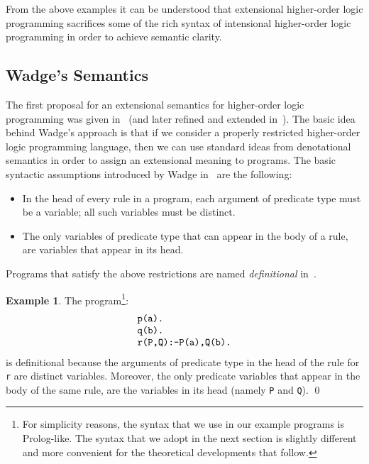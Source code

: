 \documentclass[submission,copyright]{eptcs}
\theoremstyle{definition}
\newtheorem{example}{Example}
\begin{document}
From the above examples it can be understood that extensional higher-order
logic programming sacrifices some of the rich syntax of intensional higher-order
logic programming in order to achieve semantic clarity.

\subsection{Wadge's Semantics}
The first proposal for an extensional semantics for higher-order logic programming
was given in~\cite{Wa91a} (and later refined and extended in~\cite{KRW05,CharalambidisHRW13,CharalambidisER14}).
The basic idea behind Wadge's approach is that if we consider a properly restricted
higher-order logic programming language, then we can use standard ideas from
denotational semantics in order to assign an extensional meaning to programs.
The basic syntactic assumptions introduced by Wadge in~\cite{Wa91a} are the following:
\begin{itemize}
\item In the head of every rule in a program, each argument of predicate type must be a variable; all such variables must be distinct.
\item The only variables of predicate type that can appear in the body of a
      rule, are variables that appear in its head.
\end{itemize}
Programs that satisfy the above restrictions are named {\em definitional} in~\cite{Wa91a}.
\begin{example}\label{example1}
The program\footnote{For simplicity reasons, the syntax that we use in our example programs is Prolog-like.
The syntax that we adopt in the next section is slightly different and more convenient for the theoretical
developments that follow.}:
\[
\begin{array}{l}
\mbox{\tt p(a).}\\
\mbox{\tt q(b).}\\
\mbox{\tt r(P,Q):-P(a),Q(b).}
\end{array}
\]
is definitional because the arguments of predicate type in the head of the rule for {\tt r}
are distinct variables. Moreover, the only predicate variables that appear in the body of the
same rule, are the variables in its head (namely {\tt P} and {\tt Q}). \qed
\end{example}
\end{document}
